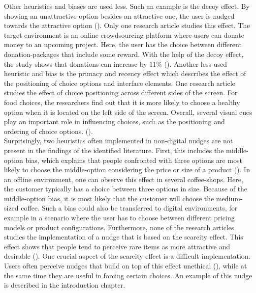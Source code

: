 Other heuristics and biases are used less. Such an example is the decoy effect. By showing an unattractive option besides an attractive one, the user is nudged towards the attractive option (\cite{schneider_digital_2018}). Only one research article studies this effect. The target environment is an online crowdsourcing platform where users can donate money to an upcoming project. Here, the user has the choice between different donation-packages that include some reward. With the help of the decoy effect, the study shows that donations can increase by 11\% (\cite{tietz_decoy_2016}).
Another less used heuristic and bias is the primacy and recency effect which describes the effect of the positioning of choice options and interface elements. One research article studies the effect of choice positioning across different sides of the screen. For food choices, the researchers find out that it is more likely to choose a healthy option when it is located on the left side of the screen. Overall, several visual cues play an important role in influencing choices, such as the positioning and ordering of choice options. (\cite{romero_healthy-left_2016}).
\\

Surprisingly, two heuristics often implemented in non-digital nudges are not present in the findings of the identified literature. First, this includes the middle-option bias, which explains that people confronted with three options are most likely to choose the middle-option considering the price or size of a product (\cite{schneider_digital_2018}). In an offline environment, one can observe this effect in several coffee-shops. Here, the customer typically has a choice between three options in size. Because of the middle-option bias, it is most likely that the customer will choose the medium-sized coffee. Such a bias could also be transferred to digital environments, for example in a scenario where the user has to choose between different pricing models or product configurations. 
Furthermore, none of the research articles studies the implementation of a nudge that is based on the scarcity effect. This effect shows that people tend to perceive rare items as more attractive and desirable (\cite{gergen_search_1980}). One crucial aspect of the scarcity effect is a difficult implementation. Users often perceive nudges that build on top of this effect unethical (\cite{sunstein_nudging_2015}), while at the same time they are useful in forcing certain choices. An example of this nudge is described in the introduction chapter.
\\

